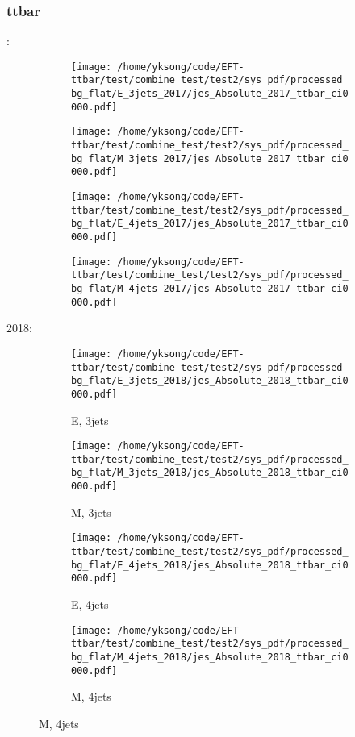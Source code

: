\documentclass{beamer}
\begin{document}
\begin{frame}
\frametitle{ttbar}
\fontsize{5}{1}:
\begin{figure}
\centering
\begin{subfigure}[b]{0.24\textwidth}
\texttt{[image: /home/yksong/code/EFT-ttbar/test/combine\_test/test2/sys\_pdf/processed\_bg\_flat/E\_3jets\_2017/jes\_Absolute\_2017\_ttbar\_ci0000.pdf]}
\end{subfigure}
\begin{subfigure}[b]{0.24\textwidth}
\texttt{[image: /home/yksong/code/EFT-ttbar/test/combine\_test/test2/sys\_pdf/processed\_bg\_flat/M\_3jets\_2017/jes\_Absolute\_2017\_ttbar\_ci0000.pdf]}
\end{subfigure}
\begin{subfigure}[b]{0.24\textwidth}
\texttt{[image: /home/yksong/code/EFT-ttbar/test/combine\_test/test2/sys\_pdf/processed\_bg\_flat/E\_4jets\_2017/jes\_Absolute\_2017\_ttbar\_ci0000.pdf]}
\end{subfigure}
\begin{subfigure}[b]{0.24\textwidth}
\texttt{[image: /home/yksong/code/EFT-ttbar/test/combine\_test/test2/sys\_pdf/processed\_bg\_flat/M\_4jets\_2017/jes\_Absolute\_2017\_ttbar\_ci0000.pdf]}
\end{subfigure}
\end{figure}
2018:
\begin{figure}
\centering
\begin{subfigure}[b]{0.24\textwidth}
\texttt{[image: /home/yksong/code/EFT-ttbar/test/combine\_test/test2/sys\_pdf/processed\_bg\_flat/E\_3jets\_2018/jes\_Absolute\_2018\_ttbar\_ci0000.pdf]}
\captionsetup{font=tiny}
\caption{E, 3jets}
\end{subfigure}
\begin{subfigure}[b]{0.24\textwidth}
\texttt{[image: /home/yksong/code/EFT-ttbar/test/combine\_test/test2/sys\_pdf/processed\_bg\_flat/M\_3jets\_2018/jes\_Absolute\_2018\_ttbar\_ci0000.pdf]}
\captionsetup{font=tiny}
\caption{M, 3jets}
\end{subfigure}
\begin{subfigure}[b]{0.24\textwidth}
\texttt{[image: /home/yksong/code/EFT-ttbar/test/combine\_test/test2/sys\_pdf/processed\_bg\_flat/E\_4jets\_2018/jes\_Absolute\_2018\_ttbar\_ci0000.pdf]}
\captionsetup{font=tiny}
\caption{E, 4jets}
\end{subfigure}
\begin{subfigure}[b]{0.24\textwidth}
\texttt{[image: /home/yksong/code/EFT-ttbar/test/combine\_test/test2/sys\_pdf/processed\_bg\_flat/M\_4jets\_2018/jes\_Absolute\_2018\_ttbar\_ci0000.pdf]}
\captionsetup{font=tiny}
\caption{M, 4jets}
\end{subfigure}
\end{figure}
\end{frame}
\end{document}
